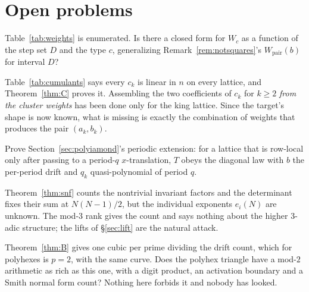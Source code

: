 \documentclass[11pt]{article}
\newcommand{\Wp}{W_{\mathrm{pair}}}
\begin{document}
\section{Open problems}
\label{sec:open}


\begin{openproblem}
Table~\ref{tab:weights} is enumerated. Is there a closed form for $W_c$ as a
function of the step set $D$ and the type $c$, generalizing
Remark~\ref{rem:notsquares}'s $\Wp(b)$ for interval $D$?
\end{openproblem}

\begin{openproblem}
Table~\ref{tab:cumulants} says every $c_k$ is linear in $n$ on every lattice, and
Theorem~\ref{thm:C} proves it. Assembling the two coefficients of $c_k$ for
$k \ge 2$ \emph{from the cluster weights} has been done only for the king
lattice. Since the target's shape is now known, what is missing is exactly the
combination of weights that produces the pair $(a_k, b_k)$.
\end{openproblem}

\begin{openproblem}
Prove Section~\ref{sec:polyiamond}'s periodic extension: for a lattice that is
row-local only after passing to a period-$q$ $x$-translation, $T$ obeys the
diagonal law with $b$ the per-period drift and $q_k$ quasi-polynomial of
period $q$.
\end{openproblem}

\begin{openproblem}
Theorem~\ref{thm:snf} counts the nontrivial invariant factors and the
determinant fixes their sum at $N(N-1)/2$, but the individual exponents
$e_i(N)$ are unknown. The mod-$3$ rank gives the count and says nothing about
the higher $3$-adic structure; the lifts of \S\ref{sec:lift} are the natural
attack.
\end{openproblem}

\begin{openproblem}
Theorem~\ref{thm:B} gives one cubic per prime dividing the drift count,
which for polyhexes is $p = 2$, with the same curve. Does the polyhex triangle
have a mod-$2$ arithmetic as rich as this one, with a digit product, an
activation boundary and a Smith normal form count? Nothing here forbids it and
nobody
has looked.
\end{openproblem}
\end{document}
